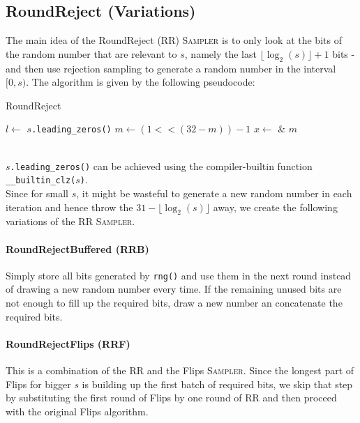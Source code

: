 \documentclass[a4paper]{scrartcl}
\begin{document}
\subsection{RoundReject (Variations)} \label{sec:3.5}
The main idea of the RoundReject (RR) \textsc{Sampler} is to only look at the bits of the random number that are relevant to $s$, namely the last $\lfloor\log_2(s)\rfloor + 1$ bits - and then use rejection sampling to generate a random number in the interval $[0,s)$.
The algorithm is given by the following pseudocode: 
\begin{algorithm}
    \caption{RoundReject}
    $l \leftarrow$ \texttt{$s$.leading\_zeros()}\;
    $m \leftarrow (1 << (32 - m)) - 1$\;
    $x \leftarrow$ \RNG \& $m$\;
    \;
\end{algorithm}
\\
\texttt{$s$.leading\_zeros()} can be achieved using the compiler-builtin function \texttt{\_\_builtin\_clz($s$)}.
\\
Since for small $s$, it might be wasteful to generate a new random number in each iteration and hence throw the $31 - \lfloor\log_2(s)\rfloor$ away, we create the following variations of the RR \textsc{Sampler}.

\paragraph*{RoundRejectBuffered (RRB)} 
Simply store all bits generated by \texttt{rng()} and use them in the next round instead of drawing a new random number every time.
If the remaining unused bits are not enough to fill up the required bits, draw a new number an concatenate the required bits.

\paragraph*{RoundRejectFlips (RRF)}
This is a combination of the RR and the Flips \textsc{Sampler}.
Since the longest part of Flips for bigger $s$ is building up the first batch of required bits, we skip that step by substituting the \glqq first round\grqq{} of Flips by one round of RR and then proceed with the original Flips algorithm.
\end{document}
